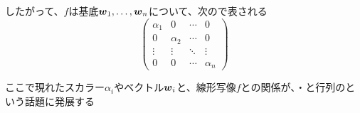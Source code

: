 \documentclass[../../../topic_linear-algebra]{subfiles}
\begin{document}
\br

したがって、$f$は基底$\vb*{w}_1, \ldots, \vb*{w}_n$について、次ので表される
\begin{equation*}
  \begin{pmatrix}
    \alpha_1 & 0        & \cdots & 0        \\
    0        & \alpha_2 & \cdots & 0        \\
    \vdots   & \vdots   & \ddots & \vdots   \\
    0        & 0        & \cdots & \alpha_n
  \end{pmatrix}
\end{equation*}

ここで現れたスカラー$\alpha_i$やベクトル$\vb*{w}_i$と、線形写像$f$との関係が、・と行列のという話題に発展する
\end{document}
